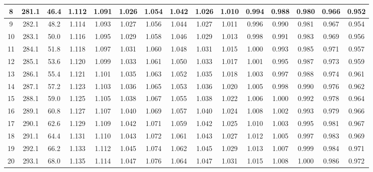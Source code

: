 \documentclass[12pt,a4paper,twoside]{article}
\begin{document}
\begin{center}
\begin{longtable}{ c c c | c c c c c c c c c c c c}
 8 & 281.1 & 46.4 & 1.112 & 1.091 & 1.026 & 1.054 & 1.042 & 1.026 & 1.010 & 0.994 & 0.988 & 0.980 & 0.966 & 0.952 \\ \hline   
 
 9 & 282.1 & 48.2 & 1.114 & 1.093 & 1.027 & 1.056 & 1.044 & 1.027 & 1.011 & 0.996 & 0.990 & 0.981 & 0.967 & 0.954 \\ \hline   
 
 10 & 283.1 & 50.0 & 1.116 & 1.095 & 1.029 & 1.058 & 1.046 & 1.029 & 1.013 & 0.998 & 0.991 & 0.983 & 0.969 & 0.956 \\ \hline   
 
 11 & 284.1 & 51.8 & 1.118 & 1.097 & 1.031 & 1.060 & 1.048 & 1.031 & 1.015 & 1.000 & 0.993 & 0.985 & 0.971 & 0.957 \\ \hline   
 
 12 & 285.1 & 53.6 & 1.120 & 1.099 & 1.033 & 1.061 & 1.050 & 1.033 & 1.017 & 1.001 & 0.995 & 0.987 & 0.973 & 0.959 \\ \hline   
 
 13 & 286.1 & 55.4 & 1.121 & 1.101 & 1.035 & 1.063 & 1.052 & 1.035 & 1.018 & 1.003 & 0.997 & 0.988 & 0.974 & 0.961 \\ \hline   
 
 14 & 287.1 & 57.2 & 1.123 & 1.103 & 1.036 & 1.065 & 1.053 & 1.036 & 1.020 & 1.005 & 0.998 & 0.990 & 0.976 & 0.962 \\ \hline   
 
 15 & 288.1 & 59.0 & 1.125 & 1.105 & 1.038 & 1.067 & 1.055 & 1.038 & 1.022 & 1.006 & 1.000 & 0.992 & 0.978 & 0.964 \\ \hline   
 
 16 & 289.1 & 60.8 & 1.127 & 1.107 & 1.040 & 1.069 & 1.057 & 1.040 & 1.024 & 1.008 & 1.002 & 0.993 & 0.979 & 0.966 \\ \hline   
 
 17 & 290.1 & 62.6 & 1.129 & 1.109 & 1.042 & 1.071 & 1.059 & 1.042 & 1.025 & 1.010 & 1.003 & 0.995 & 0.981 & 0.967 \\ \hline   
 
 18 & 291.1 & 64.4 & 1.131 & 1.110 & 1.043 & 1.072 & 1.061 & 1.043 & 1.027 & 1.012 & 1.005 & 0.997 & 0.983 & 0.969 \\ \hline   
 
 19 & 292.1 & 66.2 & 1.133 & 1.112 & 1.045 & 1.074 & 1.062 & 1.045 & 1.029 & 1.013 & 1.007 & 0.999 & 0.984 & 0.971 \\ \hline   
 
 20 & 293.1 & 68.0 & 1.135 & 1.114 & 1.047 & 1.076 & 1.064 & 1.047 & 1.031 & 1.015 & 1.008 & 1.000 & 0.986 & 0.972 \\ \hline   
 

\end{longtable}
\end{center}
\end{document}
